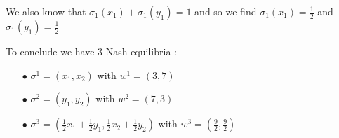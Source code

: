 We also know that $\sigma_1(x_1) + \sigma_1(y_1) = 1$ and so we find $\sigma_1(x_1)=\frac{1}{2}$ and $\sigma_1(y_1)=\frac{1}{2}$

To conclude we have 3 Nash equilibria :
\begin{itemize}
  \item[$\bullet$]  $\sigma^1 = \left(x_1,x_2\right)$ with $w^1= \left(3,7\right)$
  \item[$\bullet$]  $\sigma^2 = \left(y_1,y_2\right)$ with $w^2= \left(7,3\right)$
  \item[$\bullet$]  $\sigma^3 = \left( \frac{1}{2}x_1 + \frac{1}{2}y_1, \frac{1}{2}x_2 + \frac{1}{2}y_2\right)$ with $w^3= \left(\frac{9}{2},\frac{9}{2}\right)$
\end{itemize}
